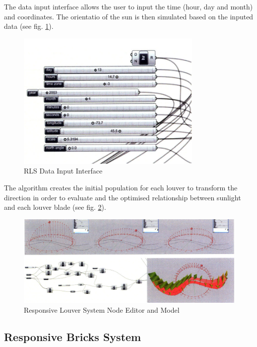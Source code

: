 The data input interface allows the user to input the time (hour, day and month) and coordinates. The orientatio of the sun is then simulated based on the inputed data (see fig. \ref{fig:RLS2}).

\begin{figure}[htbp]
\centering
\includegraphics[width=0.8\textwidth]{./Images/33-RLS2}
\caption[RLS Data Input Interface]{RLS Data Input Interface \cite{yi09}}
\label{fig:RLS2}
\end{figure}

The algorithm creates the initial population for each louver to transform the direction in order to evaluate and the optimised relationship between sunlight and each louver blade (see fig. \ref{fig:RLS3}).

\begin{figure}
\centering
\includegraphics[width=20cm]{./Images/34-RLS3}
\caption[Responsive Louver System Node Editor and Model]{Responsive Louver System Node Editor and Model \cite{yi09}}
\label{fig:RLS3}
\end{figure}

\subsection{Responsive Bricks System}

